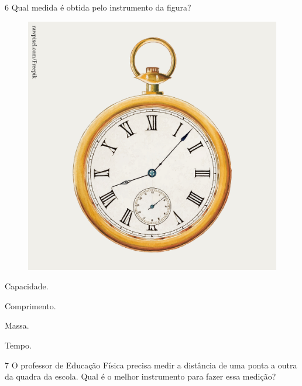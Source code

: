 \num{6} Qual medida é obtida pelo instrumento da figura?

\begin{minipage}{.5\textwidth}
\begin{figure}[H]
\centering
\includegraphics[width=.6\textwidth]{./media/image129.png}
\end{figure}
\end{minipage}
\hspace{0.5cm}
\begin{minipage}{.5\textwidth}

\begin{escolha}[itemsep=-5pt]
\item Capacidade.

\item Comprimento.

\item Massa.

\item Tempo.
\end{escolha}
\end{minipage}
\pagebreak

\num{7} O professor de Educação Física precisa medir a distância de uma ponta a
outra da quadra da escola. Qual é o melhor instrumento para fazer essa
medição?\enlargethispage{4\baselineskip}


